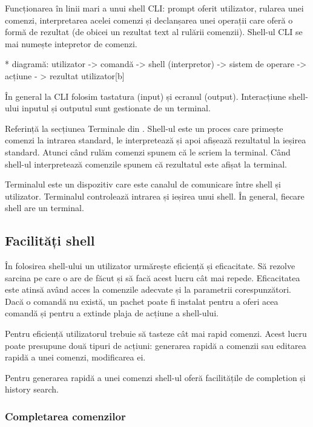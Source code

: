 Funcționarea în linii mari a unui shell CLI: prompt oferit utilizator, rularea
unei comenzi, interpretarea acelei comenzi și declanșarea unei operații care
oferă o formă de rezultat (de obicei un rezultat text al rulării comenzii).
Shell-ul CLI se mai numește intepretor de comenzi.

* diagramă: utilizator -> comandă -> shell (interpretor) -> sistem de operare -> acțiune - > rezultat utilizator[b]

În general la CLI folosim tastatura (input) și ecranul (output). Interacțiune
shell-ului inputul și outputul sunt gestionate de un terminal.

Referință la secțiunea Terminale din .
Shell-ul este un proces care primește comenzi la intrarea standard, le
interpretează și apoi afișează rezultatul la ieșirea standard. Atunci când rulăm
comenzi spunem că le scriem la terminal. Când shell-ul interpretează comenzile
spunem că rezultatul este afișat la terminal.

Terminalul este un dispozitiv care este canalul de comunicare între shell și
utilizator. Terminalul controlează intrarea și ieșirea unui shell. În general,
fiecare shell are un terminal.

\subsection{Facilități shell}
\label{sec:cli-shell-characteristics}

În folosirea shell-ului un utilizator urmărește eficiență și eficacitate. Să
rezolve sarcina pe care o are de făcut și să facă acest lucru cât mai repede.
Eficacitatea este atinsă având acces la comenzile adecvate și la parametrii
corespunzători. Dacă o comandă nu există, un pachet poate fi instalat pentru a
oferi acea comandă și pentru a extinde plaja de acțiune a shell-ului.

Pentru eficiență utilizatorul trebuie să tasteze cât mai rapid comenzi. Acest
lucru poate presupune două tipuri de acțiuni: generarea rapidă a comenzii sau
editarea rapidă a unei comenzi, modificarea ei.

Pentru generarea rapidă a unei comenzi shell-ul oferă facilitățile de completion
și history search.

\subsubsection{Completarea comenzilor}
\label{sec:cli-completion}

